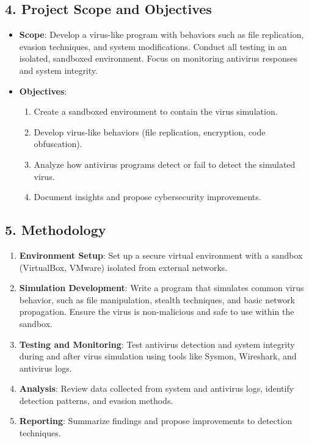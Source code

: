 \documentclass{article}
\begin{document}
\subsection*{4. Project Scope and Objectives}
\begin{itemize}
    \item \textbf{Scope}: Develop a virus-like program with behaviors such as file replication, evasion techniques, and system modifications. Conduct all testing in an isolated, sandboxed environment. Focus on monitoring antivirus responses and system integrity.
    \item \textbf{Objectives}:
    \begin{enumerate}
        \item Create a sandboxed environment to contain the virus simulation.
        \item Develop virus-like behaviors (file replication, encryption, code obfuscation).
        \item Analyze how antivirus programs detect or fail to detect the simulated virus.
        \item Document insights and propose cybersecurity improvements.
    \end{enumerate}
\end{itemize}

\subsection*{5. Methodology}
\begin{enumerate}
    \item \textbf{Environment Setup}: Set up a secure virtual environment with a sandbox (VirtualBox, VMware) isolated from external networks.
    \item \textbf{Simulation Development}: Write a program that simulates common virus behavior, such as file manipulation, stealth techniques, and basic network propagation. Ensure the virus is non-malicious and safe to use within the sandbox.
    \item \textbf{Testing and Monitoring}: Test antivirus detection and system integrity during and after virus simulation using tools like Sysmon, Wireshark, and antivirus logs.
    \item \textbf{Analysis}: Review data collected from system and antivirus logs, identify detection patterns, and evasion methods.
    \item \textbf{Reporting}: Summarize findings and propose improvements to detection techniques.
\end{enumerate}
\end{document}
